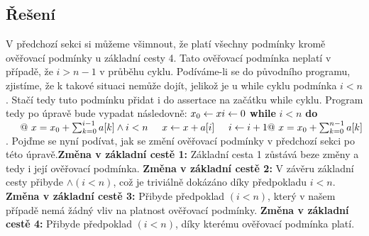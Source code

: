 \documentclass{article}
\newcommand\tab[1][0.5cm]{\hspace*{#1}}
\begin{document}
\subsection{Řešení}
V předchozí sekci si můžeme všimnout, že platí všechny podmínky kromě ověřovací podmínky u základní cesty 4. Tato ověřovací podmínka neplatí v případě, že $i > n - 1$ v průběhu cyklu. Podíváme-li se do původního programu, zjistíme, že k takové situaci nemůže dojít, jelikož je u while cyklu podmínka $i < n$. Stačí tedy tuto podmínku přidat i do assertace na začátku while cyklu. Program tedy po úpravě bude vypadat následovně:
$\newline\newline x_0 \leftarrow x \newline i \leftarrow 0 \newline $ \textbf{while} $ i < n$ \textbf{do} $\newline \tab @\ x = x_0 + \sum_{k=0}^{i-1} a[k] \wedge i < n \newline \tab x \leftarrow x + a[i] \newline \tab i \leftarrow i + 1 \newline @\ x = x_0 + \sum_{k=0}^{n-1} a[k]$. \newline\newline Pojďme se nyní podívat, jak se změní ověřovací podmínky v předchozí sekci po této úpravě.\newline\newline \textbf{Změna v základní cestě 1:} \newline Základní cesta 1 zůstává beze změny a tedy i její ověřovací podmínka. \newline\newline \textbf{Změna v základní cestě 2:} \newline V závěru základní cesty přibyde $\wedge (i < n)$, což je triviálně dokázáno díky předpokladu $ i < n$.  \newline\newline \textbf{Změna v základní cestě 3:} \newline Přibyde předpoklad $( i < n )$, který v našem případě nemá žádný vliv na platnost ověřovací podmínky.  \newline\newline \textbf{Změna v základní cestě 4:} \newline Přibyde předpoklad $( i < n )$, díky kterému ověřovací podmínka platí.
\end{document}
